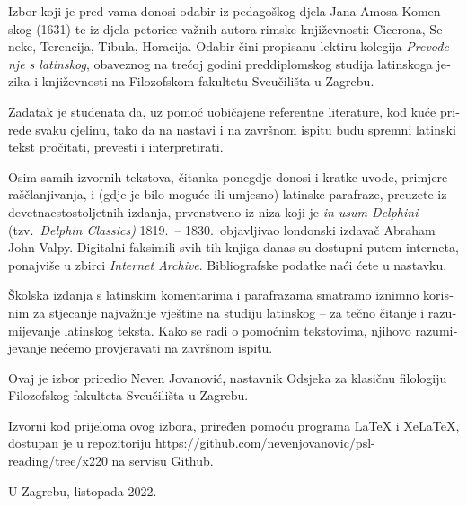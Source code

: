 \documentclass[a4paper,12pt,twoside]{book}
\begin{document}
\begin{croatian}
  

Izbor koji je pred vama donosi odabir iz pedagoškog djela Jana Amosa Komenskog (1631) te iz djela petorice važnih autora rimske književnosti: Cicerona, Seneke, Terencija, Tibula, Horacija. Odabir čini propisanu lektiru kolegija \textit{Prevođenje s latinskog}, obaveznog na trećoj godini preddiplomskog studija latinskoga jezika i književnosti na Filozofskom fakultetu Sveučilišta u Zagrebu.

Zadatak je studenata da, uz pomoć uobičajene referentne literature, kod kuće prirede svaku cjelinu, tako da na nastavi i na završnom ispitu budu spremni latinski tekst pročitati, prevesti i interpretirati.


Osim samih izvornih tekstova, čitanka ponegdje donosi i kratke uvode, primjere raščlanjivanja, i (gdje je bilo moguće ili umjesno) latinske parafraze, preuzete iz devetnaestostoljetnih izdanja, prvenstveno iz niza koji je \textit{in usum Delphini} (tzv.\ \textit{Delphin Classics)} 1819.\ – 1830.\ objavljivao londonski izdavač Abraham John Valpy. Digitalni faksimili svih tih knjiga danas su dostupni putem interneta, ponajviše u zbirci \textit{Internet Archive}. Bibliografske podatke naći ćete u nastavku. 

Školska izdanja s latinskim komentarima i parafrazama smatramo iznimno korisnim za stjecanje najvažnije vještine na studiju latinskog – za tečno čitanje i razumijevanje latinskog teksta. Kako se radi o pomoćnim tekstovima, njihovo razumijevanje nećemo provjeravati na završnom ispitu.

Ovaj je izbor priredio Neven Jovanović, nastavnik Odsjeka za klasičnu filologiju Filozofskog fakulteta Sveučilišta u Zagrebu.

Izvorni kod prijeloma ovog izbora, priređen pomoću programa LaTeX i XeLaTeX, dostupan je u repozitoriju \url{https://github.com/nevenjovanovic/psl-reading/tree/x220} na servisu Github.



\medskip

U Zagrebu, listopada 2022.

\end{croatian}
\end{document}
